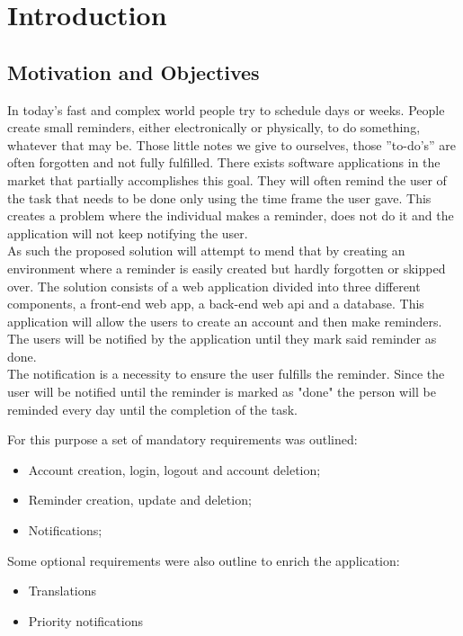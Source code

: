 \chapter{Introduction}


\section{Motivation and Objectives}
\setlength{\parindent}{0.5cm}
In today’s fast and complex world people try to schedule days or weeks. People create small
reminders, either electronically or physically, to do something, whatever that may be. Those
little notes we give to ourselves, those ”to-do’s” are often forgotten and not fully fulfilled.
There exists software applications in the market that partially accomplishes this goal. They will often remind the user of the task that needs to be done only using the time frame the user gave. This creates a problem where the individual makes a reminder,
does not do it and the application will not keep notifying the user.\\
As such the proposed solution will attempt to mend that by creating an environment where a reminder is easily
created but hardly forgotten or skipped over. The solution consists of a web application divided into three different components, a front-end web app, a back-end web \gls{api} and a database. This application will allow the users to create
an account and then make reminders. The users will be notified by the application until they mark said reminder as done.\\
The notification is a necessity to ensure the user fulfills the reminder. Since the user will be notified until the reminder is marked as "done" the person will be reminded every day until the completion of the task.

For this purpose a set of mandatory requirements was outlined:
\begin{itemize}
	\item Account creation, login, logout and account deletion;
	\item Reminder creation, update and deletion;
	\item Notifications;
\end{itemize}

Some optional requirements were also outline to enrich the application:
\begin{itemize}
	\item Translations
	\item Priority notifications
\end{itemize}

